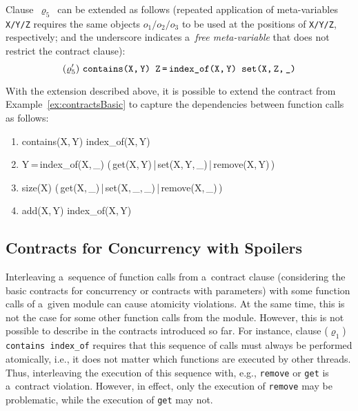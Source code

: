 Clause~$ \varrho_5 $~can be extended as follows (repeated application of meta-variables \texttt{X/Y/Z} requires the same objects $ o_1/o_2/o_3 $ to be used at the positions of \texttt{X/Y/Z}, respectively; and the underscore indicates a~\emph{free meta-variable} that does not restrict
the contract clause):
$$
    (\varrho^\prime_5)\ \text{\texttt{contains(X,\,Y) Z\,=\,index\_of(X,\,Y) set(X,\,Z,\,\_)}}
$$

\begin{example}
    With the extension described above, it is possible to extend the contract from Example~\ref{ex:contractsBasic} to capture the dependencies between function calls as follows:
    \begin{enumerate}[label={($ \varrho^\prime_{\arabic*} $)}]
        \tt
    
        \item contains(X,\,Y) index\_of(X,\,Y)

        \item Y\,=\,index\_of(X,\,\_) (\,get(X,\,Y)\,|\,set(X,\,Y,\,\_)\,|\,remove(X,\,Y)\,)
        
        \item size(X) (\,get(X,\,\_)\,|\,set(X,\,\_,\,\_)\,|\,remove(X,\,\_)\,)
        
        \item add(X,\,Y) index\_of(X,\,Y)
    \end{enumerate}
\end{example}

\subsection{Contracts for Concurrency with Spoilers}
\label{sec:contractsSpoilers}

Interleaving a~sequence of function calls from a~contract clause (considering the basic contracts for concurrency or contracts with parameters) with some function calls of a~given module can cause atomicity violations. At the same time, this is not the case for some other function calls from the module. However, this is not possible to describe in the contracts introduced so far. For instance, clause ($ \varrho_1 $) \texttt{contains index\_of} requires that this sequence of calls must always be performed atomically, i.e., it does not matter which functions are executed by other threads. Thus, interleaving the execution of this sequence with, e.g., \texttt{remove} or \texttt{get} is a~contract violation. However, in effect, only the execution of \texttt{remove} may be problematic, while the execution of \texttt{get} may not.

